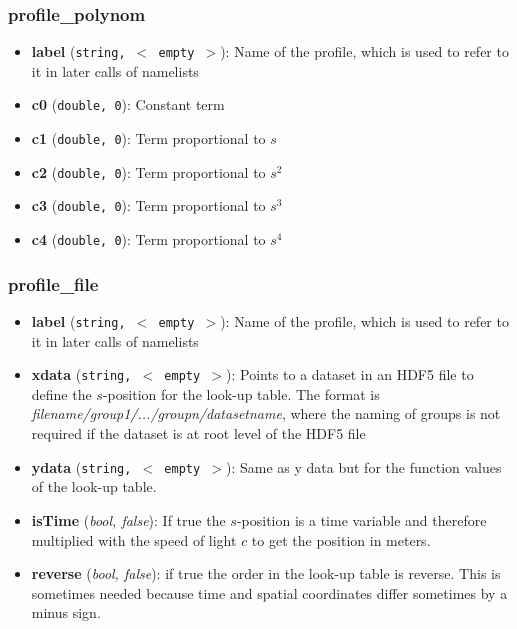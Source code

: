 \documentclass[12pt]{book}
\begin{document}
\subsubsection{\sf profile\_polynom}
\begin{itemize}
\item{\bf label} ({\tt string, $<$ empty $>$}): Name of the profile, which is used to refer to it in later calls of namelists
\item{\bf c0} ({\tt double, 0}): Constant term
\item{\bf c1} ({\tt double, 0}): Term proportional to $s$
\item{\bf c2} ({\tt double, 0}): Term proportional to $s^2$
\item{\bf c3} ({\tt double, 0}): Term proportional to $s^3$
\item{\bf c4} ({\tt double, 0}): Term proportional to $s^4$
\end{itemize}
\subsubsection{\sf profile\_file}
\begin{itemize}
\item{\bf label} ({\tt string, $<$ empty $>$}): Name of the profile, which is used to refer to it in later calls of namelists
\item{\bf xdata} ({\tt string, $<$ empty $>$}): Points to a dataset in an HDF5 file to define the $s$-position for the look-up table. The format is {\it filename/group1/.../groupn/datasetname}, where the naming of groups is not required if the dataset is at root level of the HDF5 file 
\item{\bf ydata} ({\tt string, $<$ empty $>$}): Same as y data but for the function values of the look-up table.
\item{\bf isTime} ({\it bool, false}): If true the $s$-position is a time variable and therefore multiplied with the speed of light $c$ to get the position in meters.
\item{\bf reverse} ({\it bool, false}): if true the order in the look-up table is reverse. This is sometimes needed because time and spatial coordinates differ sometimes by a minus sign.
\end{itemize}
\end{document}

